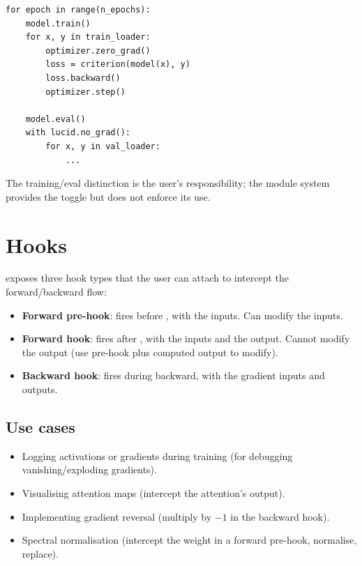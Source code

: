 \begin{lstlisting}[style=lucid,language=LucidPython]
for epoch in range(n_epochs):
    model.train()
    for x, y in train_loader:
        optimizer.zero_grad()
        loss = criterion(model(x), y)
        loss.backward()
        optimizer.step()

    model.eval()
    with lucid.no_grad():
        for x, y in val_loader:
            ...
\end{lstlisting}

The training/eval distinction is the user's responsibility; the
module system provides the toggle but does not enforce its use.

\section{Hooks}
\label{sec:module_system:hooks}

 exposes three hook types that the user can attach to
intercept the forward/backward flow:

\begin{itemize}
  \item \textbf{Forward pre-hook}: fires before
    , with the inputs. Can modify the
    inputs.
  \item \textbf{Forward hook}: fires after ,
    with the inputs and the output. Cannot modify the output (use
    pre-hook plus computed output to modify).
  \item \textbf{Backward hook}: fires during backward, with the
    gradient inputs and outputs.
\end{itemize}

\subsection{Use cases}
\label{ssec:module_system:hook_uses}

\begin{itemize}
  \item Logging activations or gradients during training (for
    debugging vanishing/exploding gradients).
  \item Visualising attention maps (intercept the attention's
    output).
  \item Implementing gradient reversal (multiply by $-1$ in the
    backward hook).
  \item Spectral normalisation (intercept the weight in a forward
    pre-hook, normalise, replace).
\end{itemize}

